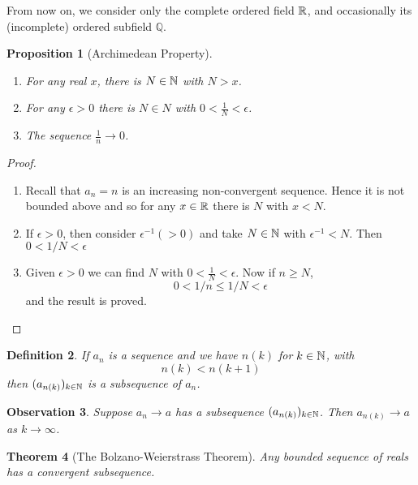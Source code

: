 \documentclass{notes}
\theoremstyle{plain}
\newtheorem{proposition}{Proposition}[chapter]
\newtheorem{theorem}[proposition]{Theorem}
\newtheorem{observation}[proposition]{Observation}
\newtheorem{definition}[proposition]{Definition}
\newcommand{\Q}{\mathbb{Q}}
\begin{document}
From now on, we consider only the complete ordered field $ \mathbb{R} $, and 
occasionally its (incomplete) ordered subfield $ \Q $.

\begin{proposition}[Archimedean Property]\hfill

\begin{enumerate}
\item For any real $ x $, there is $ N \in \mathbb{N} $ with $ N > x $.
\item For any $ \epsilon>0 $ there is $ N \in N $ with $ 0 < 
\frac{1}{N} < \epsilon $.
\item The sequence $ \frac{1}{n} \to 0 $.
\end{enumerate}
\end{proposition}

\begin{proof}\hfill

\begin{enumerate}
\item Recall that $a_{n} = n$ is an increasing non-convergent 
sequence. Hence it is not bounded above and so for any $ x \in \mathbb{R} $ 
there is $ N $ with $ x < N $.
\item If $ \epsilon > 0 $, then consider $\epsilon^{-1} (>0)$ and 
take $ N \in \mathbb{N}$ with $\epsilon^{-1} < N$. Then $0 < 1/N < \epsilon$
\item Given $ \epsilon > 0 $ we can find $ N $ with $0 < 
\frac{1}{N} < \epsilon$.  Now if $ n \geq N $, 
\[
0 < 1/n \leq 1/N < \epsilon
\]
and the result is proved.
\end{enumerate}
\end{proof}

\begin{definition}
\label{d1.5}
If $ a_{n} $ is a sequence and we have $ n(k) $ for $ k \in \mathbb{N} 
$, with \[ n(k)<n(k+1) \] then $(a_{n(k)})_{k \in \mathbb{N}}$ is a 
\emph{subsequence} of $ a_{n} $.
\end{definition}

\begin{observation}
Suppose $a_{n}\to a $ has a subsequence $(a_{n(k)})_{k \in \mathbb{N}}$.
Then $ a_{n(k)} \to a$ as $ k \to \infty $.
\end{observation}

\begin{theorem}[The Bolzano-Weierstrass Theorem]
Any bounded sequence of reals has a convergent subsequence.
\end{theorem}
\end{document}
